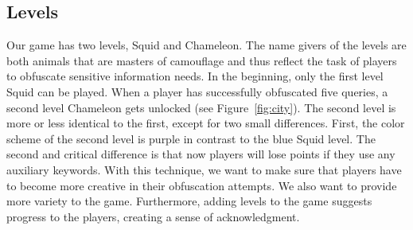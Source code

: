 \subsection*{Levels}
Our game has two levels, Squid and Chameleon. The name givers of the levels are both animals that are masters of camouflage and thus reflect the task of players to obfuscate sensitive information needs. In the beginning, only the first level Squid can be played. When a player has successfully obfuscated five queries, a second level Chameleon gets unlocked (see Figure~\ref{fig:city}). The second level is more or less identical to the first, except for two small differences. First, the color scheme of the second level is purple in contrast to the blue Squid level. The second and critical difference is that now players will lose points if they use any auxiliary keywords. With this technique, we want to make sure that players have to become more creative in their obfuscation attempts. We also want to provide more variety to the game. Furthermore, adding levels to the game suggests progress to the players, creating a sense of acknowledgment.

